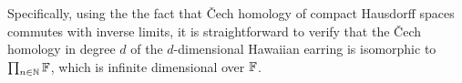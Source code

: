 Specifically, using the the fact that \v{C}ech homology of compact Hausdorff spaces commutes with inverse limits, it is straightforward to verify that the \v{C}ech homology in degree $d$ of the $d$-dimensional Hawaiian earring is isomorphic to $\prod_{n\in\mathbb{N}}\mathbb{F}$, which is infinite dimensional over $\mathbb{F}$.
%
%
